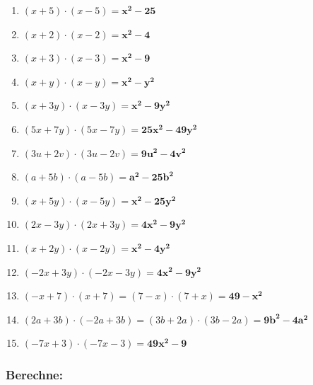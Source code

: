 \documentclass[a4paper,12pt]{article} %
\begin{document}
\begin{enumerate}[label=\alph*)]

  \item \((x + 5) \cdot (x - 5) = \mathbf{x^2 - 25}\) %

  \item \((x + 2) \cdot (x - 2) = \mathbf{x^2 - 4}\) %

  \item \((x + 3) \cdot (x - 3) = \mathbf{x^2 - 9}\) %

  \item \((x + y) \cdot (x - y) = \mathbf{x^2 - y^2}\) %

  \item \((x + 3y) \cdot (x - 3y) = \mathbf{x^2 - 9y^2}\) %

  \item \((5x + 7y) \cdot (5x - 7y) = \mathbf{25x^2 - 49y^2}\) %

  \item \((3u + 2v) \cdot (3u - 2v) = \mathbf{9u^2 - 4v^2}\) %

  \item \((a + 5b) \cdot (a - 5b) = \mathbf{a^2 - 25b^2}\) %

  \item \((x + 5y) \cdot (x - 5y) = \mathbf{x^2 - 25y^2}\) %

  \item \((2x - 3y) \cdot (2x + 3y) = \mathbf{4x^2 - 9y^2}\) %

  \item \((x + 2y) \cdot (x - 2y) = \mathbf{x^2 - 4y^2}\) %

  \item \((-2x + 3y) \cdot (-2x - 3y) = \mathbf{4x^2 - 9y^2}\) %

  \item \((-x + 7) \cdot (x + 7) = (7 - x) \cdot (7 + x) = \mathbf{49 - x^2}\) %

  \item \((2a + 3b) \cdot (-2a + 3b) = (3b + 2a) \cdot (3b - 2a) = \mathbf{9b^2 - 4a^2}\) %

  \item \((-7x + 3) \cdot (-7x - 3) = \mathbf{49x^2 - 9}\) %

\end{enumerate}

\subsubsection{Berechne:} %
\end{document}

